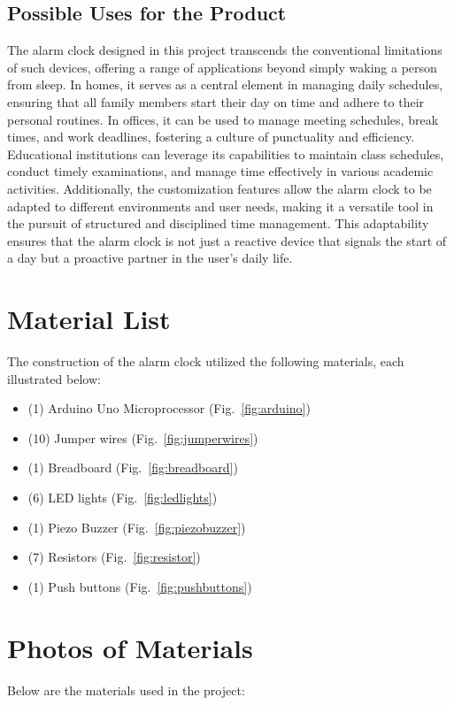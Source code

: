 \documentclass[12pt,a4paper]{article}
\begin{document}
\subsection{Possible Uses for the Product}
The alarm clock designed in this project transcends the conventional limitations of such devices, offering a range of applications beyond simply waking a person from sleep. In homes, it serves as a central element in managing daily schedules, ensuring that all family members start their day on time and adhere to their personal routines. In offices, it can be used to manage meeting schedules, break times, and work deadlines, fostering a culture of punctuality and efficiency. Educational institutions can leverage its capabilities to maintain class schedules, conduct timely examinations, and manage time effectively in various academic activities. Additionally, the customization features allow the alarm clock to be adapted to different environments and user needs, making it a versatile tool in the pursuit of structured and disciplined time management. This adaptability ensures that the alarm clock is not just a reactive device that signals the start of a day but a proactive partner in the user's daily life.

\newpage
\section{Material List}
The construction of the alarm clock utilized the following materials, each illustrated below:
\begin{itemize}
    \item (1) Arduino Uno Microprocessor (Fig.~\ref{fig:arduino})
    \item (10) Jumper wires (Fig.~\ref{fig:jumperwires})
    \item (1) Breadboard (Fig.~\ref{fig:breadboard})
    \item (6) LED lights (Fig.~\ref{fig:ledlights})
    \item (1) Piezo Buzzer (Fig.~\ref{fig:piezobuzzer})
    \item (7) Resistors (Fig.~\ref{fig:resistor})
    \item (1) Push buttons (Fig.~\ref{fig:pushbuttons})
\end{itemize}

\section{Photos of Materials}
Below are the materials used in the project:
\end{document}
